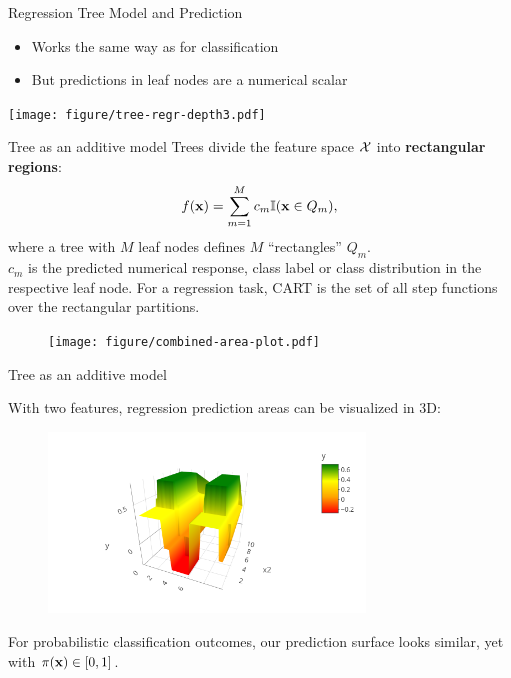 \documentclass[11pt,compress,t,notes=noshow, xcolor=table]{beamer}
\begin{document}
\begin{vbframe}{Regression Tree Model and Prediction}
  \begin{itemize}
    \item Works the same way as for classification
    \item But predictions in leaf nodes are a numerical scalar

  \end{itemize}
\vspace{1cm}
\color{fgcolor}
{\centering \texttt{[image: figure/tree-regr-depth3.pdf]}

}

\end{vbframe}



\begin{vbframe}{Tree as an additive model}
Trees divide the feature space $\mathcal{X}$ into \textbf{rectangular regions}: 
  \begin{align*}
    f(\mathbf{x}) = \sum_{m=1}^M c_m \mathbb{I}(\mathbf{x} \in Q_m),
  \end{align*}
  where a tree with $M$ leaf nodes defines $M$ \enquote{rectangles} $Q_m$.\\
  $c_m$ is the predicted numerical response, class label or class
  distribution in the respective leaf node.
  For a regression task, CART is the set of all step functions over the rectangular partitions.
  \begin{figure}
\texttt{[image: figure/combined-area-plot.pdf]}
\end{figure}

\end{vbframe}

\begin{vbframe}{Tree as an additive model}

With two features, regression prediction areas can be visualized in 3D:
\lz
\begin{figure} 
\includegraphics[width=0.75\textwidth, keepaspectratio]{figure_man/tree-contin-surface3d.png}
\end{figure}


For probabilistic classification outcomes, our prediction surface looks similar, yet with $\pi(\mathbf{x}) \in [0,1]$. 

\end{vbframe}
\end{document}
